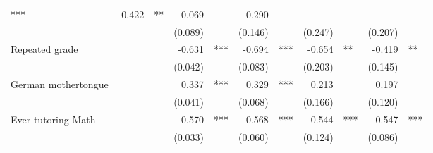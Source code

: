 \documentclass{article}
\begin{document}
\begin{table}[!h]
\begin{tabular}{lllllllllll}
  \multicolumn{1}{l}{***} &
  \multicolumn{1}{r}{-0.422} &
  \multicolumn{1}{l}{**} &
  \multicolumn{1}{r}{-0.069} &
  \multicolumn{1}{l}{} &
  \multicolumn{1}{r}{-0.290} &
  \multicolumn{1}{l}{} \\
\multicolumn{1}{l}{} &
  \multicolumn{1}{r}{} &
  \multicolumn{1}{l}{} &
  \multicolumn{1}{r}{(0.089)} &
  \multicolumn{1}{l}{} &
  \multicolumn{1}{r}{(0.146)} &
  \multicolumn{1}{l}{} &
  \multicolumn{1}{r}{(0.247)} &
  \multicolumn{1}{l}{} &
  \multicolumn{1}{r}{(0.207)} &
  \multicolumn{1}{l}{} \\
\multicolumn{1}{l}{Repeated grade} &
  \multicolumn{1}{r}{} &
  \multicolumn{1}{l}{} &
  \multicolumn{1}{r}{-0.631} &
  \multicolumn{1}{l}{***} &
  \multicolumn{1}{r}{-0.694} &
  \multicolumn{1}{l}{***} &
  \multicolumn{1}{r}{-0.654} &
  \multicolumn{1}{l}{**} &
  \multicolumn{1}{r}{-0.419} &
  \multicolumn{1}{l}{**} \\
\multicolumn{1}{l}{} &
  \multicolumn{1}{r}{} &
  \multicolumn{1}{l}{} &
  \multicolumn{1}{r}{(0.042)} &
  \multicolumn{1}{l}{} &
  \multicolumn{1}{r}{(0.083)} &
  \multicolumn{1}{l}{} &
  \multicolumn{1}{r}{(0.203)} &
  \multicolumn{1}{l}{} &
  \multicolumn{1}{r}{(0.145)} &
  \multicolumn{1}{l}{} \\
\multicolumn{1}{l}{German mothertongue} &
  \multicolumn{1}{r}{} &
  \multicolumn{1}{l}{} &
  \multicolumn{1}{r}{0.337} &
  \multicolumn{1}{l}{***} &
  \multicolumn{1}{r}{0.329} &
  \multicolumn{1}{l}{***} &
  \multicolumn{1}{r}{0.213} &
  \multicolumn{1}{l}{} &
  \multicolumn{1}{r}{0.197} &
  \multicolumn{1}{l}{} \\
\multicolumn{1}{l}{} &
  \multicolumn{1}{r}{} &
  \multicolumn{1}{l}{} &
  \multicolumn{1}{r}{(0.041)} &
  \multicolumn{1}{l}{} &
  \multicolumn{1}{r}{(0.068)} &
  \multicolumn{1}{l}{} &
  \multicolumn{1}{r}{(0.166)} &
  \multicolumn{1}{l}{} &
  \multicolumn{1}{r}{(0.120)} &
  \multicolumn{1}{l}{} \\
\multicolumn{1}{l}{Ever tutoring Math} &
  \multicolumn{1}{r}{} &
  \multicolumn{1}{l}{} &
  \multicolumn{1}{r}{-0.570} &
  \multicolumn{1}{l}{***} &
  \multicolumn{1}{r}{-0.568} &
  \multicolumn{1}{l}{***} &
  \multicolumn{1}{r}{-0.544} &
  \multicolumn{1}{l}{***} &
  \multicolumn{1}{r}{-0.547} &
  \multicolumn{1}{l}{***} \\
\multicolumn{1}{l}{} &
  \multicolumn{1}{r}{} &
  \multicolumn{1}{l}{} &
  \multicolumn{1}{r}{(0.033)} &
  \multicolumn{1}{l}{} &
  \multicolumn{1}{r}{(0.060)} &
  \multicolumn{1}{l}{} &
  \multicolumn{1}{r}{(0.124)} &
  \multicolumn{1}{l}{} &
  \multicolumn{1}{r}{(0.086)} &

\end{tabular}
\end{table}
\end{document}
